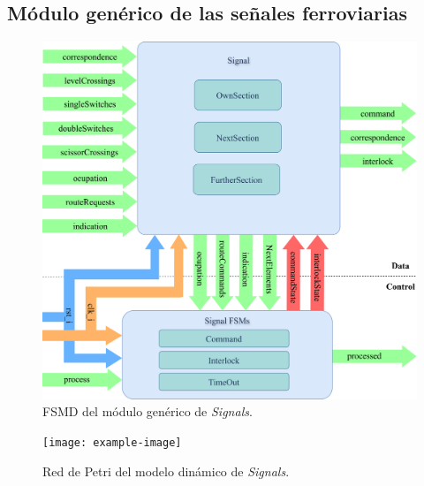 \subsection{Módulo genérico de las señales ferroviarias}

\lipsum[1]

\begin{figure}[H]
	\centering
	\includegraphics[width=1\textwidth]{Figuras/SIG_module}
	\centering\caption{FSMD del módulo genérico de \textit{Signals}.}
	\label{fig:SIG_module}
\end{figure}

\lipsum[1]

\begin{figure}[H]
	\centering
	\texttt{[image: example-image]}
	\centering\caption{Red de Petri del modelo dinámico de \textit{Signals}.}
	\label{fig:SIG_Petri}
\end{figure}

\lipsum[1]